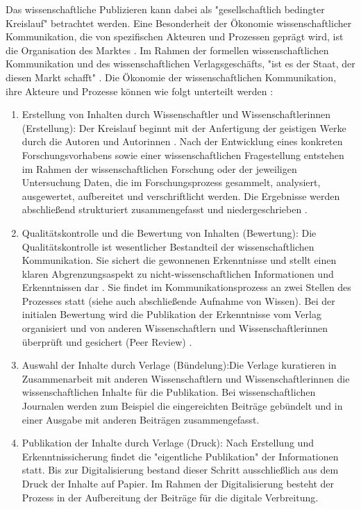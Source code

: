 Das wissenschaftliche Publizieren kann dabei als "gesellschaftlich bedingter Kreislauf" \cite{Schirmbacher_2009} betrachtet werden. Eine Besonderheit der Ökonomie wissenschaftlicher Kommunikation, die von spezifischen Akteuren und Prozessen geprägt wird, ist die Organisation des Marktes \cite{Hess_2006}. Im Rahmen der formellen wissenschaftlichen Kommunikation und des wissenschaftlichen Verlagsgeschäfts, "ist es der Staat, der diesen Markt schafft" \cite[:7]{Hirschi_2015}. Die Ökonomie der wissenschaftlichen Kommunikation, ihre Akteure und Prozesse können wie folgt unterteilt werden \cite{Hess_2006}:
\begin{enumerate}
\item Erstellung von Inhalten durch Wissenschaftler und Wissenschaftlerinnen (Erstellung): Der Kreislauf beginnt mit der Anfertigung der geistigen Werke durch die Autoren und Autorinnen \cite{Schirmbacher_2009}. Nach der Entwicklung eines konkreten Forschungsvorhabens sowie einer wissenschaftlichen Fragestellung entstehen im Rahmen der wissenschaftlichen Forschung oder der jeweiligen Untersuchung Daten, die im Forschungsprozess gesammelt, analysiert, ausgewertet, aufbereitet und verschriftlicht werden. Die Ergebnisse werden abschließend strukturiert zusammengefasst und niedergeschrieben \cite{Hess_2006}.
\item Qualitätskontrolle und die Bewertung von Inhalten (Bewertung): Die Qualitätskontrolle ist wesentlicher Bestandteil der wissenschaftlichen Kommunikation. Sie sichert die gewonnenen Erkenntnisse und stellt einen klaren Abgrenzungsaspekt zu nicht-wissenschaftlichen Informationen und Erkenntnissen dar \cite{Luhmann_1998}. Sie findet im Kommunikationsprozess an zwei Stellen des Prozesses statt (siehe auch abschließende Aufnahme von Wissen). Bei der initialen Bewertung wird die Publikation der Erkenntnisse vom Verlag organisiert \cite{Schirmbacher_2009} und von anderen Wissenschaftlern und Wissenschaftlerinnen überprüft und gesichert (Peer Review) \cite{Hess_2006}.
\item Auswahl der Inhalte durch Verlage (Bündelung):Die Verlage kuratieren in Zusammenarbeit mit anderen Wissenschaftlern und Wissenschaftlerinnen die wissenschaftlichen Inhalte für die Publikation. Bei wissenschaftlichen Journalen werden zum Beispiel die eingereichten Beiträge gebündelt und in einer Ausgabe mit anderen Beiträgen zusammengefasst.
\item Publikation der Inhalte durch Verlage (Druck): Nach Erstellung und Erkenntnissicherung findet die "eigentliche Publikation" \cite{Schirmbacher_2009} der Informationen statt. Bis zur Digitalisierung bestand dieser Schritt ausschließlich aus dem Druck der Inhalte auf Papier. Im Rahmen der Digitalisierung besteht der Prozess in der Aufbereitung der Beiträge für die digitale Verbreitung.

\end{enumerate}
